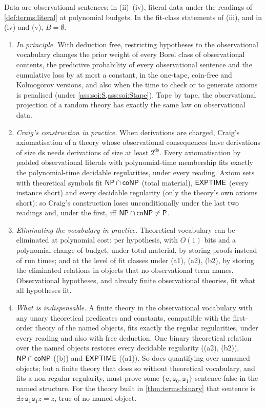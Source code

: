 \begin{theorem}\label{thm:terms:dilemma}
Data are observational sentences; in (ii)--(iv), literal data under the readings of \cref{def:terms:literal} at polynomial budgets. In the fit-class statements of (iii), and in (iv) and (v), $B=\emptyset$.
\begin{enumerate}[label=(\roman*),leftmargin=*]
\item \emph{In principle.} With deduction free, restricting hypotheses to the observational vocabulary changes the prior weight of every Borel class of observational contents, the predictive probability of every observational sentence and the cumulative loss by at most a constant, in the one-tape, coin-free and Kolmogorov versions, and also when the time to check or to generate axioms is penalised (under \cref{ass:soi:S,ass:soi:Stape}). Tape by tape, the observational projection of a random theory has exactly the same law on observational data.
\item \emph{Craig's construction in practice.} When derivations are charged, Craig's axiomatisation of a theory whose observational consequences have derivations of size $\mathrm{ds}$ needs derivations of size at least $2^{\mathrm{ds}}$. Every axiomatisation by padded observational literals with polynomial-time membership fits exactly the polynomial-time decidable regularities, under every reading. Axiom sets with theoretical symbols fit $\mathsf{NP}\cap\mathsf{coNP}$ (total material), $\mathsf{EXPTIME}$ (every instance short) and every decidable regularity (only the theory's own axioms short); so Craig's construction loses unconditionally under the last two readings and, under the first, iff $\mathsf{NP}\cap\mathsf{coNP}\ne\mathsf{P}$.
\item \emph{Eliminating the vocabulary in practice.} Theoretical vocabulary can be eliminated at polynomial cost: per hypothesis, with $O(1)$ bits and a polynomial change of budget, under total material, by storing proofs instead of run times; and at the level of fit classes under (a1), (a2), (b2), by storing the eliminated relations in objects that no observational term names. Observational hypotheses, and already finite observational theories, fit what all hypotheses fit.
\item \emph{What is indispensable.} A finite theory in the observational vocabulary with any unary theoretical predicates and constants, compatible with the first-order theory of the named objects, fits exactly the regular regularities, under every reading and also with free deduction. One binary theoretical relation over the named objects restores every decidable regularity ((a2), (b2)), $\mathsf{NP}\cap\mathsf{coNP}$ ((b)) and $\mathsf{EXPTIME}$ ((a1)). So does quantifying over unnamed objects; but a finite theory that does so without theoretical vocabulary, and fits a non-regular regularity, must prove some $\{\mathtt e,\mathtt s_0,\mathtt s_1\}$-sentence false in the named structure. For the theory built in \cref{thm:terms:binary} that sentence is $\exists z\,\mathtt s_1\mathtt s_1z=z$, true of no named object.

\end{enumerate}
\end{theorem}
